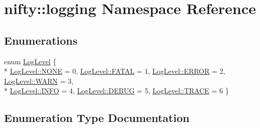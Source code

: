 \hypertarget{namespacenifty_1_1logging}{}\section{nifty\+:\+:logging Namespace Reference}
\label{namespacenifty_1_1logging}
\subsection*{Enumerations}
\begin{DoxyCompactItemize}
\item 
enum \hyperlink{namespacenifty_1_1logging_a3385625f9a0dbb17f70c47d3fca2f64d}{Log\+Level} \{ \\*
\hyperlink{namespacenifty_1_1logging_a3385625f9a0dbb17f70c47d3fca2f64dab50339a10e1de285ac99d4c3990b8693}{Log\+Level\+::\+N\+O\+N\+E} = 0, 
\hyperlink{namespacenifty_1_1logging_a3385625f9a0dbb17f70c47d3fca2f64da19da7170bea36556dde582519795f3fc}{Log\+Level\+::\+F\+A\+T\+A\+L} = 1, 
\hyperlink{namespacenifty_1_1logging_a3385625f9a0dbb17f70c47d3fca2f64dabb1ca97ec761fc37101737ba0aa2e7c5}{Log\+Level\+::\+E\+R\+R\+O\+R} = 2, 
\hyperlink{namespacenifty_1_1logging_a3385625f9a0dbb17f70c47d3fca2f64da32bd8a1db2275458673903bdb84cb277}{Log\+Level\+::\+W\+A\+R\+N} = 3, 
\\*
\hyperlink{namespacenifty_1_1logging_a3385625f9a0dbb17f70c47d3fca2f64da551b723eafd6a31d444fcb2f5920fbd3}{Log\+Level\+::\+I\+N\+F\+O} = 4, 
\hyperlink{namespacenifty_1_1logging_a3385625f9a0dbb17f70c47d3fca2f64dadc30ec20708ef7b0f641ef78b7880a15}{Log\+Level\+::\+D\+E\+B\+U\+G} = 5, 
\hyperlink{namespacenifty_1_1logging_a3385625f9a0dbb17f70c47d3fca2f64da2d3e4144aa384b18849ab9a8abad74d6}{Log\+Level\+::\+T\+R\+A\+C\+E} = 6
 \}
\end{DoxyCompactItemize}


\subsection{Enumeration Type Documentation}
\hypertarget{namespacenifty_1_1logging_a3385625f9a0dbb17f70c47d3fca2f64d}{}
